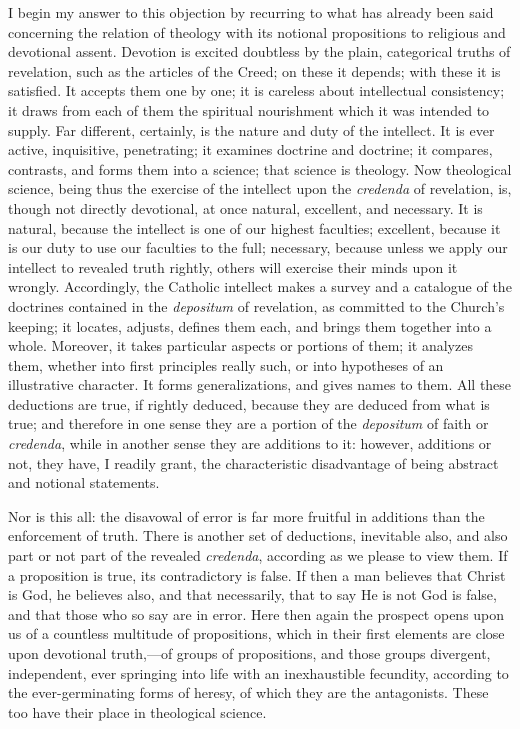I begin my answer to this objection by recurring to what has
already been said concerning the relation of theology with its
notional propositions to religious and devotional assent. Devotion is
excited doubtless by the plain, categorical truths of revelation, such
as the articles of the Creed; on these it depends; with these it
is satisfied. It accepts them one by one; it is careless about
intellectual consistency; it draws from each of them the spiritual
nourishment which it was intended to supply. Far different, certainly,
is the nature and duty of the intellect. It is ever active,
inquisitive, penetrating; it examines doctrine and doctrine; it
compares, contrasts, and forms them into a science; that science is
theology. Now theological science, being thus the exercise of the
intellect upon the \emph{credenda} of revelation, is, though not
directly devotional, at once natural, excellent, and necessary. It is
natural, because the intellect is one of our highest faculties;
excellent, because it is our duty to use our faculties to the full;
necessary, because unless we apply our intellect to revealed truth
rightly, others will exercise their minds upon it wrongly.
Accordingly, the Catholic intellect makes a survey and a catalogue of
the doctrines contained in the \emph{depositum} of revelation, as
committed to the Church's keeping; it locates, adjusts, defines them
each, and brings them together into a whole. Moreover, it takes
particular aspects or portions of them; it analyzes them, whether into
first principles really such, or into hypotheses of an illustrative
character. It forms generalizations, and gives names to them. All
these deductions are true, if rightly deduced, because they are
deduced from what is true; and therefore in one sense they are a
portion of the \emph{depositum} of faith or \emph{credenda}, while in
another sense they are additions to it: however, additions or not,
they have, I readily grant, the characteristic disadvantage of
being abstract and notional statements.

Nor is this all: the disavowal of error is far more fruitful in
additions than the enforcement of truth. There is another set of
deductions, inevitable also, and also part or not part of the revealed
\emph{credenda}, according as we please to view them. If a proposition
is true, its contradictory is false. If then a man believes that
Christ is God, he believes also, and that necessarily, that to say He
is not God is false, and that those who so say are in error. Here then
again the prospect opens upon us of a countless multitude of
propositions, which in their first elements are close upon devotional
truth,—of groups of propositions, and those groups divergent,
independent, ever springing into life with an inexhaustible fecundity,
according to the ever-germinating forms of heresy, of which they are
the antagonists. These too have their place in theological science.

